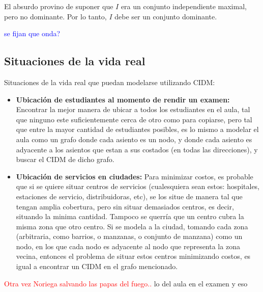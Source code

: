 El absurdo provino de suponer que $I$ era un conjunto independiente maximal, pero no dominante. Por lo tanto, $I$ debe ser un conjunto dominante.










\textcolor{blue}{se fijan que onda?}

\subsection{Situaciones de la vida real}

Situaciones de la vida real que puedan modelarse utilizando CIDM:

\begin{itemize}
	\item \textbf{Ubicación de estudiantes al momento de rendir un examen:} Encontrar la mejor manera de ubicar a todos los estudiantes en el aula, tal que ninguno este suficientemente cerca de otro como para copiarse, pero tal que entre la mayor cantidad de estudiantes posibles, es lo mismo a modelar el aula como un grafo donde cada asiento es un nodo, y donde cada asiento es adyacente a los asientos que estan a sus costados (en todas las direcciones), y buscar el CIDM de dicho grafo.
	\item \textbf{Ubicación de servicios en ciudades:} Para minimizar costos, es probable que si se quiere situar centros de servicios (cualesquiera sean estos: hospitales, estaciones de servicio, distribuidoras, etc), se los situe de manera tal que tengan amplia cobertura, pero sin situar demasiados centros, es decir, situando la minima cantidad. Tampoco se querría que un centro cubra la misma zona que otro centro. Si se modela a la ciudad, tomando cada zona (arbitraria, como barrios, o manzanas, o conjunto de manzana) como un nodo, en los que cada nodo es adyacente al nodo que representa la zona vecina, entonces el problema de situar estos centros minimizando costos, es igual a encontrar un CIDM en el grafo mencionado.
\end{itemize}

\textcolor{red}{Otra vez Noriega salvando las papas del fuego..} lo del aula en el examen y eso